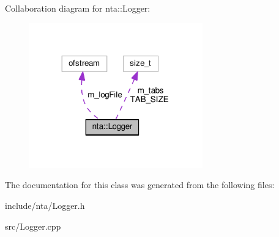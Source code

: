 Collaboration diagram for nta\+:\+:Logger\+:\nopagebreak
\begin{figure}[H]
\begin{center}
\leavevmode
\includegraphics[width=212pt]{d4/d22/classnta_1_1Logger__coll__graph}
\end{center}
\end{figure}


The documentation for this class was generated from the following files\+:\begin{DoxyCompactItemize}
\item 
include/nta/Logger.\+h\item 
src/Logger.\+cpp\end{DoxyCompactItemize}
